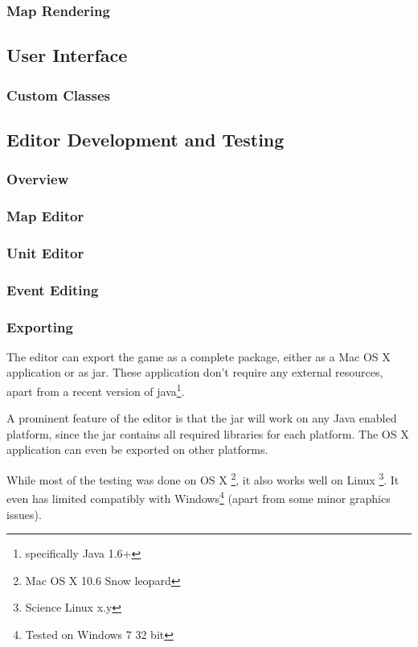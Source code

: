 \subsubsection{Map Rendering}
\label{ssub:map_rendering}

\subsection{User Interface}


\subsubsection{Custom Classes} %
\label{ssub:custom_classes}


\subsection{Editor Development and Testing}

\subsubsection{Overview}
\label{ssub:overview}

\subsubsection{Map Editor}
\label{ssub:map_editor}

\subsubsection{Unit Editor}
\label{ssub:unit_editors}

\subsubsection{Event Editing}

\subsubsection{Exporting}
\label{ssub:exporting}

The editor can export the game as a complete package, either as a Mac OS X application or as jar. These application don't require any external resources, apart from a recent version of java\footnote{specifically Java 1.6+}.

A prominent feature of the editor is that the jar will work on any Java enabled platform, since the jar contains all required libraries for each platform. The OS X application can even be exported on other platforms.

While most of the testing was done on OS X \footnote{Mac OS X 10.6 Snow leopard}, it also works well on Linux \footnote{Science  Linux x.y}. It even has limited compatibly with Windows\footnote{Tested on Windows 7 32 bit} (apart from some minor graphics issues).
